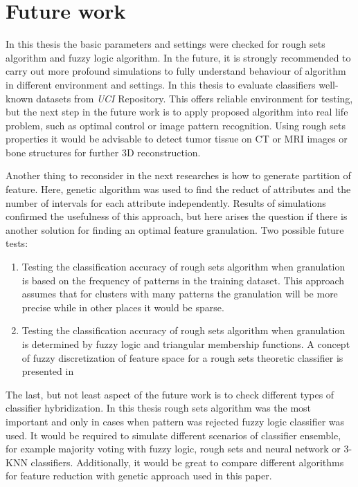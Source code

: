\section{Future work}
\label{cha:FutureWork}
In this thesis the basic parameters and settings were checked for rough sets
algorithm and fuzzy logic algorithm. In the future, it is strongly recommended 
to carry out more profound simulations to fully understand behaviour of
algorithm in different environment and settings. In this thesis to evaluate
classifiers well-known datasets from \textit{UCI} Repository. This offers
reliable environment for testing, but the next step in the future work is to
apply proposed algorithm into real life problem, such as optimal control or
image pattern recognition. Using rough sets properties it would be advisable to
detect tumor tissue on CT or MRI images or bone structures for further 3D
reconstruction.

Another thing to reconsider in the next researches is how to generate partition
of feature. Here, genetic algorithm was used to find the reduct of attributes
and the number of intervals for each attribute independently. Results of
simulations confirmed the usefulness of this approach, but here arises the
question if there is another solution for finding an optimal feature
granulation. Two possible future tests:
\begin{enumerate}
    \item Testing the classification accuracy of rough sets algorithm when
        granulation is based on the frequency of patterns in the training
        dataset. This approach assumes that for clusters with many patterns the
        granulation will be more precise while in other places it would be
        sparse.
    \item Testing the classification accuracy of rough sets algorithm when
        granulation is determined by fuzzy logic and triangular membership
        functions. A concept of fuzzy discretization of feature space for a
        rough sets theoretic classifier is presented in \cite{bib100}
\end{enumerate}

The last, but not least aspect of the future work is to check different types
of classifier hybridization. In this thesis rough sets algorithm was the most
important and only in cases when pattern was rejected fuzzy logic classifier
was used. It would be required to simulate different scenarios of classifier
ensemble, for example majority voting with fuzzy logic, rough sets and neural
network or 3-KNN classifiers. Additionally, it would be great to compare
different algorithms for feature reduction with genetic approach used in this
paper. 
